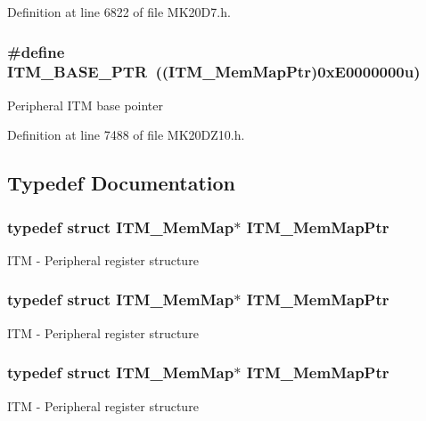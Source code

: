 Definition at line 6822 of file M\+K20\+D7.\+h.

\subsubsection[{\texorpdfstring{I\+T\+M\+\_\+\+B\+A\+S\+E\+\_\+\+P\+TR}{ITM_BASE_PTR}}]{\setlength{\rightskip}{0pt plus 5cm}\#define I\+T\+M\+\_\+\+B\+A\+S\+E\+\_\+\+P\+TR~(({\bf I\+T\+M\+\_\+\+Mem\+Map\+Ptr})0x\+E0000000u)}\hypertarget{group___i_t_m___peripheral_gafaddee8fe8b6a898d4e5edc43ee0d703}{}\label{group___i_t_m___peripheral_gafaddee8fe8b6a898d4e5edc43ee0d703}
Peripheral I\+TM base pointer 

Definition at line 7488 of file M\+K20\+D\+Z10.\+h.



\subsection{Typedef Documentation}
\subsubsection[{\texorpdfstring{I\+T\+M\+\_\+\+Mem\+Map\+Ptr}{ITM_MemMapPtr}}]{\setlength{\rightskip}{0pt plus 5cm}typedef struct {\bf I\+T\+M\+\_\+\+Mem\+Map}$\ast$ {\bf I\+T\+M\+\_\+\+Mem\+Map\+Ptr}}\hypertarget{group___i_t_m___peripheral_ga4a7413c0256960668a95765d8b74e5b3}{}\label{group___i_t_m___peripheral_ga4a7413c0256960668a95765d8b74e5b3}
I\+TM -\/ Peripheral register structure 
\subsubsection[{\texorpdfstring{I\+T\+M\+\_\+\+Mem\+Map\+Ptr}{ITM_MemMapPtr}}]{\setlength{\rightskip}{0pt plus 5cm}typedef struct {\bf I\+T\+M\+\_\+\+Mem\+Map}$\ast$ {\bf I\+T\+M\+\_\+\+Mem\+Map\+Ptr}}\hypertarget{group___i_t_m___peripheral_ga4a7413c0256960668a95765d8b74e5b3}{}\label{group___i_t_m___peripheral_ga4a7413c0256960668a95765d8b74e5b3}
I\+TM -\/ Peripheral register structure 
\subsubsection[{\texorpdfstring{I\+T\+M\+\_\+\+Mem\+Map\+Ptr}{ITM_MemMapPtr}}]{\setlength{\rightskip}{0pt plus 5cm}typedef struct {\bf I\+T\+M\+\_\+\+Mem\+Map}$\ast$ {\bf I\+T\+M\+\_\+\+Mem\+Map\+Ptr}}\hypertarget{group___i_t_m___peripheral_ga4a7413c0256960668a95765d8b74e5b3}{}\label{group___i_t_m___peripheral_ga4a7413c0256960668a95765d8b74e5b3}
I\+TM -\/ Peripheral register structure 